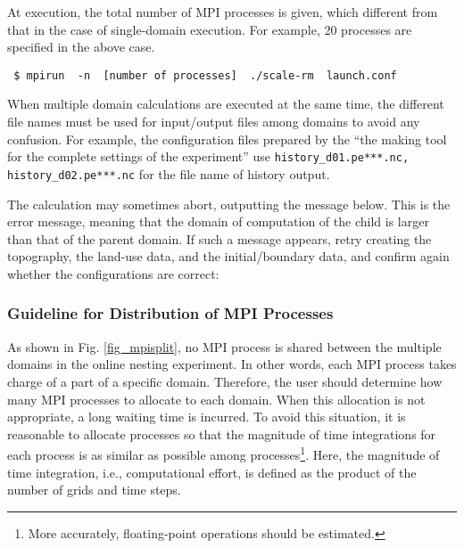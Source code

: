 At execution, the total number of MPI processes is given, which different from that in the case of single-domain execution. For example, 20 processes are specified in the above case.
\begin{verbatim}
 $ mpirun  -n  [number of processes]  ./scale-rm  launch.conf
\end{verbatim}

When multiple domain calculations are executed at the same time,
the different file names must be used for input/output files
among domains to avoid any confusion.
For example, the configuration files prepared by the 
``the making tool for the complete settings of the experiment''
use \verb|history_d01.pe***.nc, history_d02.pe***.nc| for the file name of history output.

The calculation may sometimes abort, outputting the message below. This is the error message, meaning that the domain of computation of the child  is larger than that of the parent domain. If such a message appears, retry creating the topography, the land-use data, and the initial/boundary data, and confirm again whether the configurations are correct:


\subsubsection{Guideline for Distribution of MPI Processes}

As shown in Fig. \ref{fig_mpisplit}, no MPI process is shared between the multiple domains in the online nesting experiment. In other words, each MPI process takes charge of a part of a specific domain. Therefore, the user should determine how many MPI processes to allocate to each domain. When this allocation is not appropriate, a long waiting time is incurred. To avoid this situation, it is reasonable to allocate processes so that the magnitude of time integrations for each process is as similar as possible among processes\footnote{More accurately, floating-point operations should be estimated.}. Here, the magnitude of time integration, i.e., computational effort, is defined as the product of the number of grids and time steps.

